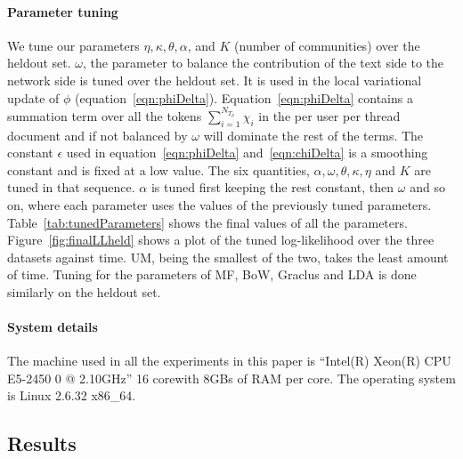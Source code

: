 \documentclass{sig-alternate}
\begin{document}
\paragraph{Parameter tuning}
We tune our parameters $\eta, \kappa,
\theta, \alpha$, and $K$ (number of communities) over the heldout set.
$\omega$, the parameter to balance the contribution of the text side to the 
network side is tuned over the
heldout set. It is used in the local variational update of
$\phi$ (equation~\ref{eqn:phiDelta}).
Equation~\ref{eqn:phiDelta} contains a summation term over all the tokens
$\sum_{i=1}^{N_{T_p}}\chi_i$ in the per user per thread document and if  not
balanced by $\omega$ will dominate the rest of the terms. The constant $\epsilon$ used in
equation~\ref{eqn:phiDelta} and~\ref{eqn:chiDelta} is a smoothing constant and
is fixed at a low value. The six quantities, $\alpha, \omega, \theta, \kappa,
\eta$ and $K$ are tuned in that sequence. $\alpha$ is tuned first keeping the rest
constant, then $\omega$ and so on, where each parameter uses
the values of the previously tuned parameters. Table~\ref{tab:tunedParameters}
shows the final values of all the parameters. Figure~\ref{fig:finalLLheld} 
shows a plot of the tuned log-likelihood over the three
datasets against time. UM, being the smallest of the two, takes
the least amount of time. Tuning for the parameters of MF, BoW, Graclus and LDA
is done similarly on the heldout set.

\paragraph{System details} The machine used in all the experiments in this paper
is ``Intel(R) Xeon(R) CPU E5-2450 0 @ 2.10GHz'' 16 corewith 8GBs of
RAM per core. The operating system is Linux 2.6.32 x86\_64. 

\subsection{Results}
\label{sec:results}
\end{document}
